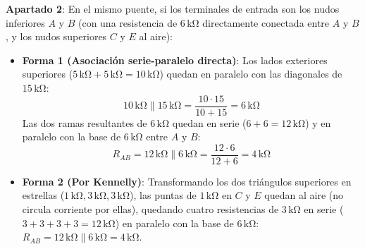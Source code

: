 \begin{ejercicio}
\textbf{Apartado 2}: En el mismo puente, si los terminales de entrada son los nudos inferiores $A$ y $B$ (con una resistencia de $6\,\si{\kilo\ohm}$ directamente conectada entre $A$ y $B$, y los nudos superiores $C$ y $E$ al aire):
\begin{itemize}
    \item \textbf{Forma 1 (Asociación serie-paralelo directa)}: Los lados exteriores superiores ($5\,\si{\kilo\ohm} + 5\,\si{\kilo\ohm} = 10\,\si{\kilo\ohm}$) quedan en paralelo con las diagonales de $15\,\si{\kilo\ohm}$:
    \begin{equation*}
        10\,\si{\kilo\ohm} \parallel 15\,\si{\kilo\ohm} = \frac{10\cdot 15}{10 + 15} = 6\,\si{\kilo\ohm}
    \end{equation*}
    Las dos ramas resultantes de $6\,\si{\kilo\ohm}$ quedan en serie ($6 + 6 = 12\,\si{\kilo\ohm}$) y en paralelo con la base de $6\,\si{\kilo\ohm}$ entre $A$ y $B$:
    \begin{equation*}
        \boxed{R_{AB} = 12\,\si{\kilo\ohm} \parallel 6\,\si{\kilo\ohm} = \frac{12\cdot 6}{12 + 6} = 4\,\si{\kilo\ohm}}
    \end{equation*}
    \item \textbf{Forma 2 (Por Kennelly)}: Transformando los dos triángulos superiores en estrellas ($1\,\si{\kilo\ohm}, 3\,\si{\kilo\ohm}, 3\,\si{\kilo\ohm}$), las puntas de $1\,\si{\kilo\ohm}$ en $C$ y $E$ quedan al aire (no circula corriente por ellas), quedando cuatro resistencias de $3\,\si{\kilo\ohm}$ en serie ($3+3+3+3 = 12\,\si{\kilo\ohm}$) en paralelo con la base de $6\,\si{\kilo\ohm}$: $R_{AB} = 12\,\si{\kilo\ohm} \parallel 6\,\si{\kilo\ohm} = 4\,\si{\kilo\ohm}$.
\end{itemize}


\end{ejercicio}

